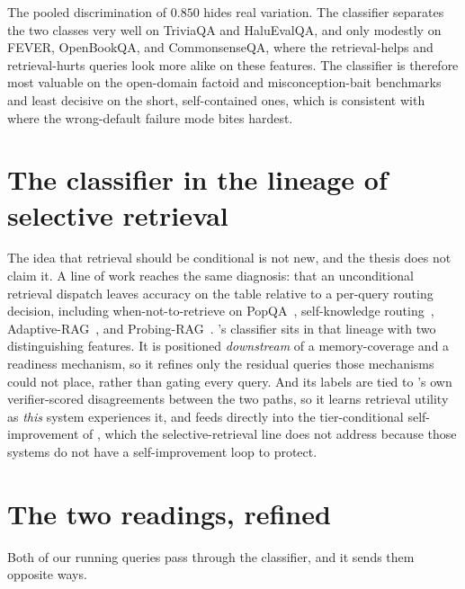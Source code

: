 \begin{pitfall}
The pooled discrimination of $0.850$ hides real variation. The classifier separates the
two classes very well on TriviaQA and HaluEvalQA, and only modestly on FEVER, OpenBookQA,
and CommonsenseQA, where the retrieval-helps and retrieval-hurts queries look more alike
on these features. The classifier is therefore most valuable on the open-domain factoid
and misconception-bait benchmarks and least decisive on the short, self-contained ones,
which is consistent with where the wrong-default failure mode bites hardest.
\end{pitfall}

\section{The classifier in the lineage of selective retrieval}
\label{sec:ruc-lineage}

\begin{defence}
The idea that retrieval should be conditional is not new, and the thesis does not claim
it. A line of work reaches the same diagnosis: that an unconditional retrieval dispatch
leaves accuracy on the table relative to a per-query routing decision, including
when-not-to-retrieve on PopQA~\cite{mallen2023whennot}, self-knowledge
routing~\cite{wang2023skr}, Adaptive-RAG~\cite{jeong2024adaptive}, and
Probing-RAG~\cite{baek2025probing}. \caem{}'s classifier sits in that lineage with two
distinguishing features. It is positioned \emph{downstream} of a memory-coverage and a
readiness mechanism, so it refines only the residual queries those mechanisms could not
place, rather than gating every query. And its labels are tied to \caem{}'s own
verifier-scored disagreements between the two paths, so it learns retrieval utility as
\emph{this} system experiences it, and feeds directly into the tier-conditional
self-improvement of , which the selective-retrieval line does
not address because those systems do not have a self-improvement loop to protect.
\end{defence}

\section{The two readings, refined}
\label{sec:ruc-scenarios}

Both of our running queries pass through the classifier, and it sends them opposite ways.

